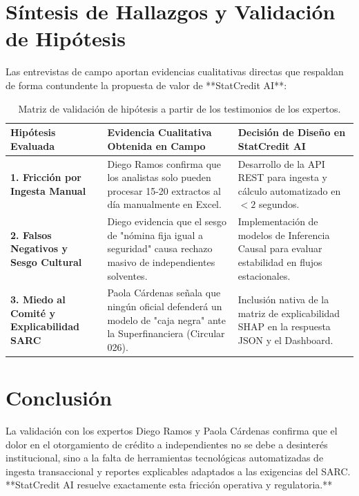 \documentclass[11pt,a4paper]{article}
\begin{document}
\section{Síntesis de Hallazgos y Validación de Hipótesis}

Las entrevistas de campo aportan evidencias cualitativas directas que respaldan de forma contundente la propuesta de valor de **StatCredit AI**:

\begin{table}[h!]
\centering
\small
\begin{tabularx}{\textwidth}{p{3.5cm} X p{4.5cm}}
\toprule
\textbf{Hipótesis Evaluada} & \textbf{Evidencia Cualitativa Obtenida en Campo} & \textbf{Decisión de Diseño en StatCredit AI} \\
\midrule
\textbf{1. Fricción por Ingesta Manual} & Diego Ramos confirma que los analistas solo pueden procesar 15-20 extractos al día manualmente en Excel. & Desarrollo de la API REST para ingesta y cálculo automatizado en $<2$ segundos. \\
\midrule
\textbf{2. Falsos Negativos y Sesgo Cultural} & Diego evidencia que el sesgo de "nómina fija igual a seguridad" causa rechazo masivo de independientes solventes. & Implementación de modelos de Inferencia Causal para evaluar estabilidad en flujos estacionales. \\
\midrule
\textbf{3. Miedo al Comité y Explicabilidad SARC} & Paola Cárdenas señala que ningún oficial defenderá un modelo de "caja negra" ante la Superfinanciera (Circular 026). & Inclusión nativa de la matriz de explicabilidad SHAP en la respuesta JSON y el Dashboard. \\
\bottomrule
\end{tabularx}
\caption{Matriz de validación de hipótesis a partir de los testimonios de los expertos.}
\end{table}

\section{Conclusión}

La validación con los expertos Diego Ramos y Paola Cárdenas confirma que el dolor en el otorgamiento de crédito a independientes no se debe a desinterés institucional, sino a la falta de herramientas tecnológicas automatizadas de ingesta transaccional y reportes explicables adaptados a las exigencias del SARC. **StatCredit AI resuelve exactamente esta fricción operativa y regulatoria.**
\end{document}
